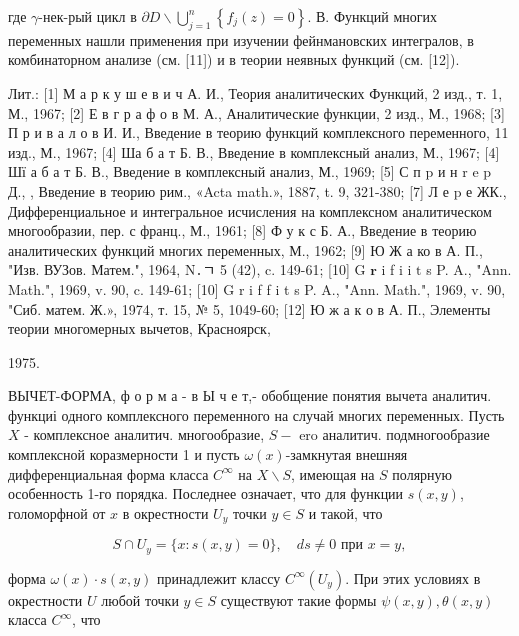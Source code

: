 \documentclass[10pt]{article}
\begin{document}
где $\gamma$-нек-рый цикл в $\partial D \backslash \bigcup_{j=1}^{n}\left\{f_{j}(z)=0\right\}$. В. Функций многих переменных нашли применения при изучении фейнмановских интегралов, в комбинаторном анализе (см. [11]) и в теории неявных функций (см. [12]).



Лит.: [1] М а р к у ш е в и ч А. И., Теория аналитических Функций, 2 изд., т. 1, М., 1967; [2] Е в г р а ф о в М. А., Аналитические функции, 2 изд., М., 1968; [3] П р и в а л о в И. И., Введение в теорию функций комплексного переменного, 11 изд., М., 1967; [4] Ша б а т Б. В., Введение в комплексный анализ, М., 1967; [4] Шї а б а т Б. В., Введение в комплексный анализ, М., 1969; [5] С п p и н r e p Д., , Введение в теорию рим., «Acta math.», 1887, t. 9, 321-380; [7] Л е p е ЖК., Дифференциальное и интегральное исчисления на комплексном аналитическом многообразии, пер. с франц., М., 1961; [8] Ф у к с Б. А., Введение в теорию аналитических функций многих переменных, М., 1962; [9] Ю Ж а ко в А. П., "Изв. ВУЗов. Матем.", 1964, N․ㄱ 5 (42), c. 149-61; [10] G $\mathbf{r}$ i f i i $\mathrm{t}$ s P. A., "Ann. Math.", 1969, v. 90, c. 149-61; [10] G r i f f i t s P. A., "Ann. Math.", 1969, v. 90, "Сиб. матем. Ж.», 1974, т. 15, № 5, 1049-60; [12] Ю ж а к о в А. П., Элементы теории многомерных вычетов, Красноярск,

1975.



ВЫЧЕТ-ФОРМА, ф о р м а - в Ы ч е т,- обобщение понятия вычета аналитич. функциі одного комплексного переменного на случай многих переменных. Пусть $X$ - комплексное аналитич. многообразие, $S-$ ero аналитич. подмногообразие комплексной коразмерности 1 и пусть $\omega(x)$-замкнутая внешняя дифференциальная форма класса $C^{\infty}$ на $X \backslash S$, имеющая на $S$ полярную особенность 1-го порядка. Последнее означает, что для функции $s(x, y)$, голоморфной от $x$ в окрестности $U_{y}$ точки $y \in S$ и такой, что



\[

S \cap U_{y}=\{x: s(x, y)=0\}, \quad d s \neq 0 \text { при } x=y,

\]



форма $\omega(x) \cdot s(x, y)$ принадлежит классу $C^{\infty}\left(U_{y}\right)$. При этих условиях в окрестности $U$ любой точки $y \in S$ существуют такие формы $\psi(x, y), \theta(x, y)$ класса $C^{\infty}$, что
\end{document}
